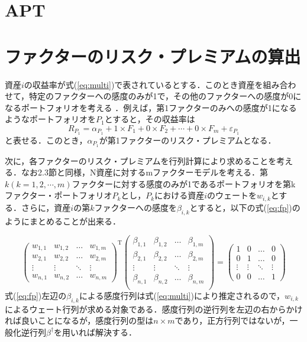 \documentclass[11pt]{jreport}
\begin{document}
\section{APT}
\section{ファクターのリスク・プレミアムの算出}
資産$i$の収益率が式(\ref{eq:multi})で表されているとする．このとき資産を組み合わせて，特定のファクターへの感度のみが1で，その他のファクターへの感度が0になるポートフォリオを考える ．例えば，第1ファクターのみへの感度が1になるようなポートフォリオを$P_1$とすると，その収益率は
\begin{equation}
R_{P_1} = \alpha_{P_1} + 1\times F_1 + 0\times F_2 + \cdots + 0\times F_m + \varepsilon_{P_1} 
\end{equation}
と表せる．このとき，$\alpha_{P_1}$が第1ファクターのリスク・プレミアムとなる．

次に，各ファクターのリスク・プレミアムを行列計算により求めることを考える．なお2.3節と同様，N資産に対するmファクターモデルを考える．第$k(k=1,2,\cdots,m)$ファクターに対する感度のみが1であるポートフォリオを第kファクター・ポートフォリオ$P_k$とし，$P_k$における資産$i$のウェートを$w_{i,k}$とする．さらに，資産$i$の第$k$ファクターへの感度を$\beta_{i,k}$とすると，以下の式(\ref{eq:fp})のようにまとめることが出来る．

\begin{equation}
\left(
	\begin{array}{cccc}
	w_{1,1} & w_{1,2} & \ldots & w_{1,m}\\
	w_{2,1} & w_{2,2} & \ldots & w_{2,m}\\
	\vdots & \vdots & \ddots & \vdots\\
	w_{n,1} & w_{n,2} & \ldots & w_{n,m}
	\end{array}
\right)^{\mathrm{T}}
\left(
	\begin{array}{cccc}
	\beta_{1,1} & \beta_{1,2} & \ldots & \beta_{1,m}\\
	\beta_{2,1} & \beta_{2,2} & \ldots & \beta_{2,m}\\
	\vdots & \vdots & \ddots & \vdots\\
	\beta_{n,1} & \beta_{n,2} & \ldots & \beta_{n,m}\\
	\end{array}
\right)=
\left(
	\begin{array}{cccc}
	1 & 0 & \ldots & 0\\
	0 & 1 & \ldots & 0\\
	\vdots & \vdots & \ddots & \vdots \\
	0 & 0 & \ldots & 1
	\end{array}
\right)
\label{eq:fp}
\end{equation}
式(\ref{eq:fp})左辺の$\beta_{i,k}$による感度行列は式(\ref{eq:multi})により推定されるので，$w_{i,k}$によるウェート行列が求める対象である．感度行列の逆行列を左辺の右からかければ良いことになるが，感度行列の型は$n\times m$であり，正方行列ではないが，一般化逆行列$\beta^\dag$を用いれば解決する．
\end{document}
